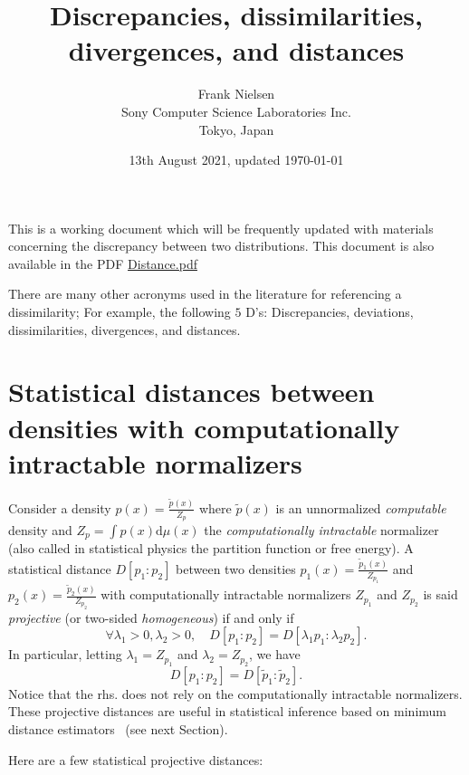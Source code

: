 \documentclass[11pt]{article}
\title{Discrepancies, dissimilarities, divergences, and distances}
\date{13th August 2021, updated \today}
\author{Frank Nielsen\\ Sony Computer Science Laboratories Inc.\\ Tokyo, Japan}
\def\dmu{\mathrm{d}\mu}
\def\dmu{\mathrm{d}\mu}
\begin{document}
\maketitle

This is a working document which will be frequently updated with materials concerning the discrepancy between two distributions.
\vskip 0.5cm
This document is also available in the PDF \url{Distance.pdf} 
\vskip 0.5cm

There are many other acronyms used in the literature for referencing a dissimilarity; For example, the following $5$ D's:
Discrepancies, deviations, dissimilarities, divergences, and distances.

\tableofcontents

\section{Statistical distances between densities with computationally intractable normalizers}

Consider a density $p(x)=\frac{\tilde p(x)}{Z_p}$ where $\tilde p(x)$ is an unnormalized {\em computable} density 
and $Z_p=\int p(x) \dmu(x)$ the {\em computationally intractable} normalizer (also called in statistical physics the partition function or free energy).
A statistical distance $D[p_1:p_2]$ between two densities $p_1(x)=\frac{\tilde p_1(x)}{Z_{p_1}}$ and $p_2(x)=\frac{\tilde p_2(x)}{Z_{p_2}}$ with computationally intractable normalizers $Z_{p_1}$ and $Z_{p_2}$ is said {\em projective} (or two-sided {\em homogeneous}) if and only if
$$
\forall \lambda_1>0,\lambda_2>0,\quad D[p_1:p_2]=D[\lambda_1p_1:\lambda_2 p_2].
$$
In particular, letting $\lambda_1=Z_{p_1}$ and $\lambda_2=Z_{p_2}$, we have
$$
D[p_1:p_2]=D[\tilde{p}_1:\tilde{p}_2].
$$
Notice that the rhs. does not rely on the computationally intractable normalizers.
These projective distances are useful in statistical inference based on minimum distance estimators~\cite{MinDistance-2019} (see next Section).


Here are a few statistical projective distances:
\end{document}
